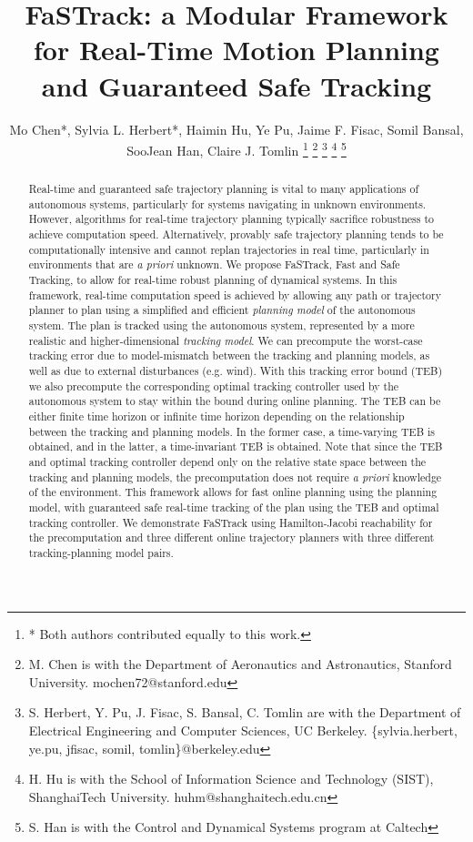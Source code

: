 \documentclass[journal]{IEEEtran}
\title{\LARGE \bf FaSTrack: a Modular Framework for Real-Time Motion Planning and Guaranteed Safe Tracking}
\author{Mo Chen*, Sylvia L. Herbert*, Haimin Hu, Ye Pu, Jaime F. Fisac, Somil Bansal, SooJean Han, Claire J. Tomlin
\thanks{* Both authors contributed equally to this work.}
\thanks{M. Chen is with the Department of Aeronautics and Astronautics, Stanford University. mochen72@stanford.edu}
\thanks{S. Herbert, Y. Pu, J. Fisac, S. Bansal, C. Tomlin are with the Department of Electrical Engineering and Computer Sciences, UC Berkeley. \{sylvia.herbert, ye.pu, jfisac, somil, tomlin\}@berkeley.edu}
\thanks{H. Hu is with the School of Information Science and Technology (SIST), ShanghaiTech
University. huhm@shanghaitech.edu.cn }
\thanks{S. Han is with the Control and Dynamical Systems program at Caltech}
}
\begin{document}
\maketitle
\thispagestyle{empty}
\pagestyle{empty}

\begin{abstract}
Real-time and guaranteed safe trajectory planning is vital to many applications of autonomous systems, particularly for systems navigating in unknown environments.
However, algorithms for real-time trajectory planning typically sacrifice robustness to achieve computation speed. 
Alternatively, provably safe trajectory planning tends to be computationally intensive and cannot replan trajectories in real time, particularly in environments that are \textit{a priori }unknown. 
We propose FaSTrack, Fast and Safe Tracking, to allow for real-time robust planning of dynamical systems. 
In this framework, real-time computation speed is achieved by allowing any path or trajectory planner to plan using a simplified and efficient \textit{planning model} of the autonomous system.  
The plan is tracked using the autonomous system, represented by a more realistic and higher-dimensional \textit{tracking model}. 
We can precompute the worst-case tracking error due to model-mismatch between the tracking and planning models, as well as due to external disturbances (e.g. wind).  
With this tracking error bound (TEB) we also precompute the corresponding optimal tracking controller used by the autonomous system to stay within the bound during online planning.
The TEB can be either finite time horizon or infinite time horizon depending on the relationship between the tracking and planning models.
In the former case, a time-varying TEB is obtained, and in the latter, a time-invariant TEB is obtained.
Note that since the TEB and optimal tracking controller depend only on the relative state space between the tracking and planning models, the precomputation does not require \textit{a priori} knowledge of the environment.
This framework allows for fast online planning using the planning model, with guaranteed safe real-time tracking of the plan using the TEB and optimal tracking controller.
We demonstrate FaSTrack using Hamilton-Jacobi reachability for the precomputation and three different online trajectory planners with three different tracking-planning model pairs.
\end{abstract}
\end{document}

